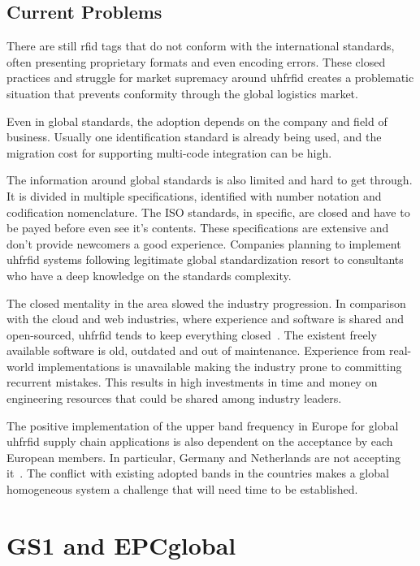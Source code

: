 \subsection{Current Problems} \label{sec:currentproblems}

There are still \ac{rfid} tags that do not conform with the international standards, often presenting proprietary formats and even encoding errors.
These closed practices and struggle for market supremacy around \ac{uhfrfid} creates a problematic situation that prevents conformity through the global logistics market.

Even in global standards, the adoption depends on the company and field of business. Usually one identification standard is already being used, and the migration cost for supporting multi-code integration can be high.

The information around global standards is also limited and hard to get through. It is divided in multiple specifications, identified with number notation and codification nomenclature. 
The ISO standards, in specific, are closed and have to be payed before even see it's contents.
These specifications are extensive and don't provide newcomers a good experience. 
Companies planning to implement \ac{uhfrfid} systems following legitimate global standardization resort to consultants who have a deep knowledge on the standards complexity.

The closed mentality in the area slowed the industry progression. In comparison with the cloud and web industries, where experience and software is shared and open-sourced, \ac{uhfrfid} tends to keep everything closed~\cite{WhatCouldSlow}. The existent freely available software is old, outdated and out of maintenance. Experience from real-world implementations is unavailable making the industry prone to committing recurrent mistakes. This results in high investments in time and money on engineering resources that could be shared among industry leaders.

The positive implementation of the upper band frequency in Europe for global \ac{uhfrfid} supply chain applications is also dependent on the acceptance by each European members. In particular, Germany and Netherlands are not accepting it~\cite{EUUpperBand}. The conflict with existing adopted bands in the countries makes a global homogeneous system a challenge that will need time to be established.

\section{GS1 and EPCglobal}

